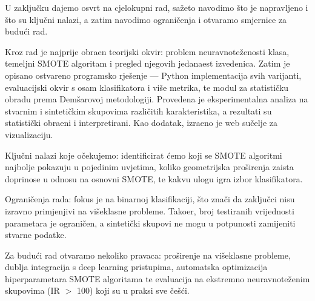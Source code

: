 
U zaklju\v{c}ku dajemo osvrt na cjelokupni rad, sa\v{z}eto navodimo
\v{s}to je napravljeno i \v{s}to su klju\v{c}ni nalazi, a zatim
navodimo ograni\v{c}enja i otvaramo smjernice za budu\'{c}i rad.

Kroz rad je najprije obra\dj{}en teorijski okvir: problem
neuravnote\v{z}enosti klasa, temeljni SMOTE algoritam i pregled njegovih
jedanaest izvedenica. Zatim je opisano ostvareno programsko rje\v{s}enje
— Python implementacija svih varijanti, evaluacijski okvir s osam
klasifikatora i vi\v{s}e metrika, te modul za statisti\v{c}ku obradu
prema Dem\v{s}arovoj metodologiji. Provedena je eksperimentalna analiza
na stvarnim i sinteti\v{c}kim skupovima razli\v{c}itih karakteristika, a
rezultati su statisti\v{c}ki obra\dj{}eni i interpretirani. Kao dodatak,
izra\dj{}eno je web su\v{c}elje za vizualizaciju.

Klju\v{c}ni nalazi koje o\v{c}ekujemo: identificirat \'{c}emo koji se
SMOTE algoritmi najbolje pokazuju u pojedinim uvjetima, koliko
geometrijska pro\v{s}irenja zaista doprinose u odnosu na osnovni SMOTE,
te kakvu ulogu igra izbor klasifikatora.

Ograni\v{c}enja rada: fokus je na binarnoj klasifikaciji, \v{s}to
zna\v{c}i da zaklju\v{c}ci nisu izravno primjenjivi na vi\v{s}eklasne
probleme. Tako\dj{}er, broj testiranih vrijednosti parametara je
ograni\v{c}en, a sinteti\v{c}ki skupovi ne mogu u potpunosti zamijeniti
stvarne podatke.

Za budu\'{c}i rad otvaramo nekoliko pravaca: pro\v{s}irenje na
vi\v{s}eklasne probleme, dublja integracija s deep learning pristupima,
automatska optimizacija hiperparametara SMOTE algoritama te evaluacija
na ekstremno neuravnote\v{z}enim skupovima (IR $>$ 100) koji su u praksi
sve \v{c}e\v{s}\'{c}i.
